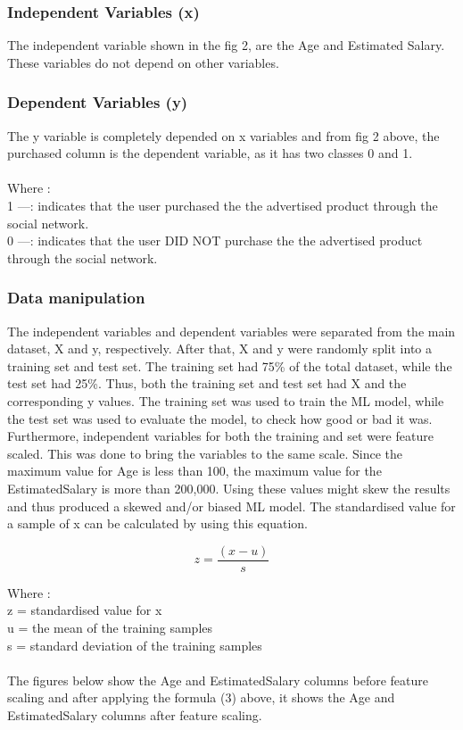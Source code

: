 \documentclass[conference]{IEEEtran}
\begin{document}
\subsubsection{Independent Variables (x)}
The independent variable shown in the fig 2, are the Age and Estimated Salary. These variables do not depend on other variables.

\subsubsection{Dependent Variables (y)}
The y variable is completely depended on x variables and from fig 2 above, the purchased column is the dependent variable, as it has two classes 0 and 1.\\
\\
Where :\\
1 —: indicates that the user purchased the the advertised product through the social network.\\
0 —: indicates that the user DID NOT purchase the the advertised product through the social network.\\

\subsubsection{Data manipulation}
The independent variables and dependent variables were separated from the main dataset, X and y, respectively.
After that, X and y were randomly split into a training set and test set. The training set had 75\% of the total dataset, while the test set had 25\%. Thus, both the training set and test set had X and the corresponding y values.
The training set was used to train the ML model, while the test set was used to evaluate the model, to check how good or bad it was.\\
Furthermore, independent variables for both the training and set were feature scaled. This was done to bring the variables to the same scale. Since the maximum value for Age is less than 100, the maximum value for the EstimatedSalary is more than 200,000. Using these values might skew the results and thus produced a skewed and/or biased ML model. The standardised value for a sample of x can be calculated by using this equation.

\begin{equation} 
\label{equ3}
z = \frac{(x-u)}{s}
\end{equation} 

Where :\\
z = standardised value for x\\
u = the mean of the training samples\\
s = standard deviation of the training samples\\
\\
The figures below show the Age and EstimatedSalary columns before feature scaling and after applying the formula (3) above, it shows the Age and EstimatedSalary columns after feature scaling.
\end{document}

